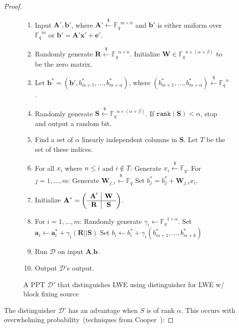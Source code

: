\documentclass[11pt]{article}
\newcommand{\vect}[1]{\ensuremath{\textbf{#1}}}
\newcommand{\Fq}{\ensuremath{\mathbb{F}_q}}
\newcommand{\D}{\mathcal{D}}
\newcommand{\rank}{\ensuremath{\mathtt{rank}}\xspace}
\newcommand{\ve}{\vect{e}}
\newcommand{\vS}{\vect{S}}
\newcommand{\vA}{\vect{A}}
\newcommand{\vW}{\vect{W}}
\newcommand{\vR}{\vect{R}}
\newcommand{\vx}{\vect{x}}
\newcommand{\va}{\vect{a}}
\newcommand{\vb}{\vect{b}}
\begin{document}
\begin{proof}
\begin{figure}[t]
\begin{framed}
\begin{enumerate}
\item Input $\vA', \vb'$, where $\vA' \overset{\$} \leftarrow \Fq^{m\times n}$ and $\vb'$ is either uniform over $\Fq^m$ or $\vb' = \vA'\vx' +\ve'$.
\item Randomly generate $\vect{R} \overset{\$}\leftarrow \Fq^{\alpha \times n}$. Initialize $\vW \in \Fq^{n\times (\alpha+\beta)}$ to be the zero matrix.
\item Let $\vb^* = (\vb', b^*_{m+1}, \ldots,b^*_{m+\alpha})$, where $(b^*_{m+1}, \ldots, b^*_{m+\alpha} )\overset{\$} \leftarrow \Fq^\alpha$.\label{step:b generation}
\item Randomly generate $\vect{S} \overset{\$}\leftarrow \Fq^{\alpha \times (\alpha+\beta)}$.
		\subitem If $\rank(\vect{S})<\alpha$, stop and output a random bit.
\item Find a set of $\alpha$ linearly independent columns in $\vS$.  Let $T$ be the set of these indices.
\item For all $x_i$ where $n\leq i$ and $i\not \in T$:\label{step:fill in matrix}
\subitem Generate $x_i\overset{\$}\leftarrow \Fq$.  
\subitem For $j=1,..., m$:
\subsubitem Generate $\vW_{j, i}\overset{\$}\leftarrow \Fq$
\subsubitem Set $b_j^* = b_j^* + \vW_{j, i} x_i$.
\item Initialize $\vA^*  = \left(\begin{array}{c | c}\vA' & \vW\\\hline \vR & \vS\end{array}\right)$.
\item \label{step:randomization}
For {$i=1,..., m$}:
\subitem Randomly generate $\gamma_i \leftarrow \Fq^{1 \times \alpha}$.
\subitem Set $\va_{i} \leftarrow \va^*_{i}+\gamma_i (\vR||\vS)$
\subitem Set $b_i \leftarrow b^*_i + \gamma_i (b^*_{m+1},..., b^*_{m+k})$
\item Run $\D$ on input $\vA, \vb$.
\item Output $\D$'s output.
\end{enumerate}
\end{framed}
\caption{A PPT $\mathcal{D'}$ that distinguishes LWE using distinguisher for LWE w/ block fixing source}
\label{fig:perfectLWEreduction}
\end{figure}
The distinguisher $\mathcal{D'}$ has an advantage when $S$ is of rank $\alpha$.  This occurs with overwhelming probability~(techniques from Cooper~\cite{cooper2000rank}):

\end{proof}
\end{document}
